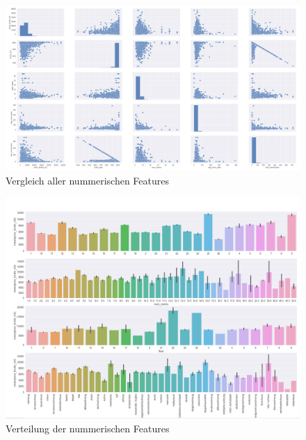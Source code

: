 \begin{figure}[h]
  \centering
  \includegraphics[width=\linewidth]{images/anhang/analysis/cross.png}
  \caption{Vergleich aller nummerischen Features}
\end{figure}


\begin{figure}[h]
  \centering
  \includegraphics[width=\linewidth]{images/anhang/analysis/Verteilung.png}
  \caption{Verteilung der nummerischen Features}
\end{figure}



